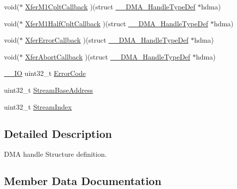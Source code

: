 \begin{DoxyCompactItemize}
\item 
void($\ast$ \mbox{\hyperlink{struct_____d_m_a___handle_type_def_a5968053a3674b44460c1aa150499e01d}{Xfer\+M1\+Cplt\+Callback}} )(struct \mbox{\hyperlink{struct_____d_m_a___handle_type_def}{\+\_\+\+\_\+\+D\+M\+A\+\_\+\+Handle\+Type\+Def}} $\ast$hdma)
\item 
void($\ast$ \mbox{\hyperlink{struct_____d_m_a___handle_type_def_aea9b02c5206e1b12380e0b83b5281e0d}{Xfer\+M1\+Half\+Cplt\+Callback}} )(struct \mbox{\hyperlink{struct_____d_m_a___handle_type_def}{\+\_\+\+\_\+\+D\+M\+A\+\_\+\+Handle\+Type\+Def}} $\ast$hdma)
\item 
void($\ast$ \mbox{\hyperlink{struct_____d_m_a___handle_type_def_a5905bba1de7dc9d803a50dfb44d0a9e8}{Xfer\+Error\+Callback}} )(struct \mbox{\hyperlink{struct_____d_m_a___handle_type_def}{\+\_\+\+\_\+\+D\+M\+A\+\_\+\+Handle\+Type\+Def}} $\ast$hdma)
\item 
void($\ast$ \mbox{\hyperlink{struct_____d_m_a___handle_type_def_a5866f59e3a12760e559c4547ebf19d37}{Xfer\+Abort\+Callback}} )(struct \mbox{\hyperlink{struct_____d_m_a___handle_type_def}{\+\_\+\+\_\+\+D\+M\+A\+\_\+\+Handle\+Type\+Def}} $\ast$hdma)
\item 
\mbox{\hyperlink{core__sc300_8h_aec43007d9998a0a0e01faede4133d6be}{\+\_\+\+\_\+\+IO}} uint32\+\_\+t \mbox{\hyperlink{struct_____d_m_a___handle_type_def_a67a2a8b907bc9b5c0af87f9de2bffc29}{Error\+Code}}
\item 
uint32\+\_\+t \mbox{\hyperlink{struct_____d_m_a___handle_type_def_ab9250d33bdf9de7b87fa4325382518c4}{Stream\+Base\+Address}}
\item 
uint32\+\_\+t \mbox{\hyperlink{struct_____d_m_a___handle_type_def_a3ada2bc091757d7b92ab8ca70211ccae}{Stream\+Index}}
\end{DoxyCompactItemize}


\subsection{Detailed Description}
D\+MA handle Structure definition. 

\subsection{Member Data Documentation}
\mbox{\label{struct_____d_m_a___handle_type_def_a67a2a8b907bc9b5c0af87f9de2bffc29}} 
